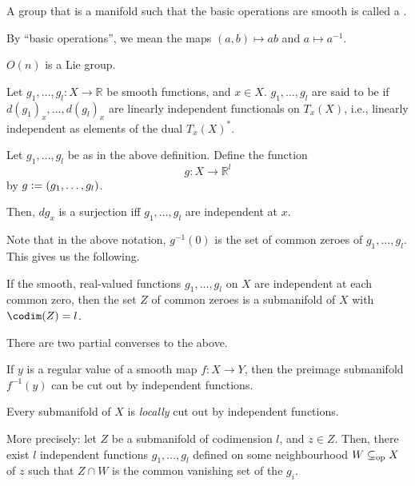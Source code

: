 \begin{defn}
	A group that is a manifold such that the basic operations are smooth is called a .
\end{defn}
By ``basic operations'', we mean the maps $(a, b) \mapsto ab$ and $a \mapsto a^{-1}$.

\begin{ex}
	$O(n)$ is a Lie group.
\end{ex}

\begin{defn}
	Let $g_{1}, \ldots, g_{l} : X \to \mathbb{R}$ be smooth functions, and $x \in X$. \newline
	$g_{1}, \ldots, g_{l}$ are said to be  if $d(g_{1})_{x}, \ldots, d(g_{l})_{x}$ are linearly independent functionals on $T_{x}(X)$, i.e., linearly independent as elements of the dual $T_{x}(X)^{\ast}$.
\end{defn}

\begin{prop}
	Let $g_{1}, \ldots, g_{l}$ be as in the above definition. Define the function
	\begin{equation*} 
		g : X \to \mathbb{R}^{l}
	\end{equation*}
	by $g \vcentcolon= (g_{1}, \ldots, g_{l})$.

	Then, $dg_{x}$ is a surjection iff $g_{1}, \ldots, g_{l}$ are independent at $x$.
\end{prop}

Note that in the above notation, $g^{-1}(0)$ is the set of common zeroes of $g_{1}, \ldots, g_{l}$. This gives us the following.

\begin{thm}
	If the smooth, real-valued functions $g_{1}, \ldots, g_{l}$ on $X$ are independent at each common zero, then the set $Z$ of common zeroes is a submanifold of $X$ with $\codim(Z) = l$.
\end{thm}

There are two partial converses to the above.

\begin{prop}
	If $y$ is a regular value of a smooth map $f : X \to Y$, then the preimage submanifold $f^{-1}(y)$ can be cut out by independent functions.
\end{prop}

\begin{prop}
	Every submanifold of $X$ is \emph{locally} cut out by independent functions. 

	More precisely: let $Z$ be a submanifold of codimension $l$, and $z \in Z$. Then, there exist $l$ independent functions $g_{1}, \ldots, g_{l}$ defined on some neighbourhood $W \subseteq_{\operatorname{op}} X$ of $z$ such that $Z \cap W$ is the common vanishing set of the $g_{i}$.
\end{prop}

